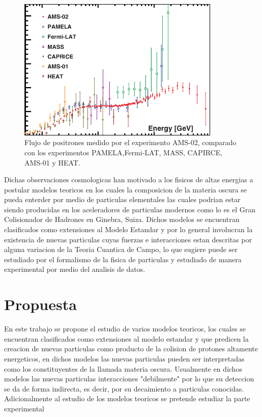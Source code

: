 \begin{figure}
\begin{center}
  \includegraphics[width=3.8in]{AMS_positronflux.png}
  \caption{Flujo de positrones medido por el experimento AMS-02, comparado con los experimentos PAMELA,Fermi-LAT, MASS, CAPIRCE, AMS-01 y HEAT.}
  \label{fig:AMS_positron}
\end{center}
\end{figure}

Dichas observaciones cosmologicas han motivado a los fisicos de 
altas energias a postular modelos teoricos en los cuales la composicion de la materia oscura se pueda enterder por medio de particulas elementales las cuales podrian estar siendo producidas en los aceleradores de particulas modernos como lo es el Gran Colisionador de Hadrones en Ginebra, Suiza.  Dichos modelos se encuentran clasificados como extensiones al Modelo Estandar y por lo general involucran la existencia de nuevas particulas cuyas fuerzas e interacciones estan descritas por alguna variacion de la Teoria Cuantica de Campo, lo que sugiere puede ser estudiado por el formalismo de la fisica de particulas y estudiado de manera experimental por medio del analisis de datos. 

\chapter{Propuesta}

En este trabajo se propone el estudio de varios modelos teoricos, los cuales se encuentran clasificados como extensiones al modelo estandar y que predicen la creacion de nuevas particulas como producto de la colision de protones altamente energeticos, en dichos modelos las nuevas particulas pueden ser interpretadas como los constituyentes de la llamada materia oscura.   Usualmente en dichos modelos las nuevas particulas interacciones "debilmente" por lo que su deteccion se da de forma indirecta, es decir, por su decaimiento a particulas conocidas.  Adicionalmente al estudio de los modelos teoricos se pretende estudiar la parte experimental 


